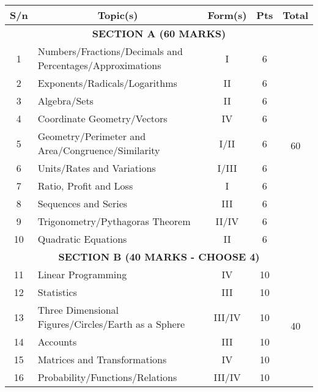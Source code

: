 \begin{center}
\begin{tabular}{cl|c|c|c|} \\ \hline
\multicolumn{1}{|c|}{\textbf{S\slash n}} & \multicolumn{1}{c|}{\textbf{Topic(s)}} & \textbf{Form(s)} & \textbf{Pts} & \textbf{Total} \\ \hline \hline
\multicolumn{5}{|c|}{\textbf{SECTION A (60 MARKS)}} \\ \hline
\multicolumn{1}{|c|}{1} & Numbers\slash Fractions\slash Decimals and Percentages\slash Approximations & I & 6 & \multirow{10}{*}{60} \\ \cline{1-4}
\multicolumn{1}{|c|}{2} & Exponents\slash Radicals\slash Logarithms & II & 6 & \\ \cline{1-4}
\multicolumn{1}{|c|}{3} & Algebra\slash Sets & II & 6 & \\ \cline{1-4}
\multicolumn{1}{|c|}{4} & Coordinate Geometry\slash Vectors & IV & 6 & \\ \cline{1-4}
\multicolumn{1}{|c|}{5} & Geometry\slash Perimeter and Area\slash Congruence\slash Similarity & I\slash II & 6 & \\ \cline{1-4}
\multicolumn{1}{|c|}{6} & Units\slash Rates and Variations & I\slash III & 6 & \\ \cline{1-4}
\multicolumn{1}{|c|}{7} & Ratio, Profit and Loss & I & 6 & \\ \cline{1-4}
\multicolumn{1}{|c|}{8} & Sequences and Series & III & 6 & \\ \cline{1-4}
\multicolumn{1}{|c|}{9} & Trigonometry\slash Pythagoras Theorem & II\slash IV & 6 & \\ \cline{1-4}
\multicolumn{1}{|c|}{10} & Quadratic Equations & II & 6 & \\ \hline
\multicolumn{5}{|c|}{\textbf{SECTION B (40 MARKS - CHOOSE 4)}} \\ \hline
\multicolumn{1}{|c|}{11} & Linear Programming & IV & 10 & \multirow{6}{*}{40} \\ \cline{1-4}
\multicolumn{1}{|c|}{12} & Statistics & III & 10 & \\ \cline{1-4}
\multicolumn{1}{|c|}{13} & Three Dimensional Figures\slash Circles\slash Earth as a Sphere & III\slash IV & 10 & \\ \cline{1-4}
\multicolumn{1}{|c|}{14} & Accounts & III & 10 & \\ \cline{1-4}
\multicolumn{1}{|c|}{15} & Matrices and Transformations & IV & 10 & \\ \cline{1-4}
\multicolumn{1}{|c|}{16} & Probability\slash Functions\slash Relations & III\slash IV & 10 & \\ \hline

\end{tabular}
\end{center}

